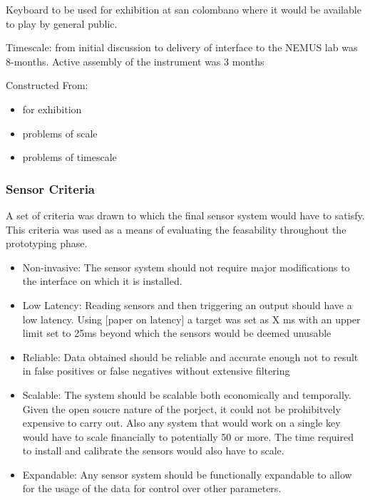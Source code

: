Keyboard to be used for exhibition at san colombano where it would be
available to play by general public.

Timescale: from initial discussion to delivery of interface to the NEMUS
lab was 8-months. Active assembly of the instrument was 3 months

Constructed From:

\begin{itemize}
\item
  for exhibition
\item
  problems of scale
\item
  problems of timescale
\end{itemize}

\subsubsection{Sensor Criteria}\label{sensor-criteria}

A set of criteria was drawn to which the final sensor system would have
to satisfy. This criteria was used as a means of evaluating the
feasability throughout the prototyping phase.

\begin{itemize}
\item
  Non-invasive: The sensor system should not require major modifications
  to the interface on which it is installed.
\item
  Low Latency: Reading sensors and then triggering an output should have
  a low latency. Using {[}paper on latency{]} a target was set as X ms
  with an upper limit set to 25ms beyond which the sensors would be
  deemed unusable
\item
  Reliable: Data obtained should be reliable and accurate enough not to
  result in false positives or false negatives without extensive
  filtering
\item
  Scalable: The system should be scalable both economically and
  temporally. Given the open soucre nature of the porject, it could not
  be prohibitvely expensive to carry out. Also any system that would
  work on a single key would have to scale financially to potentially 50
  or more. The time required to install and calibrate the sensors would
  also have to scale.
\item
  Expandable: Any sensor system should be functionally expandable to
  allow for the usage of the data for control over other parameters.
\end{itemize}

